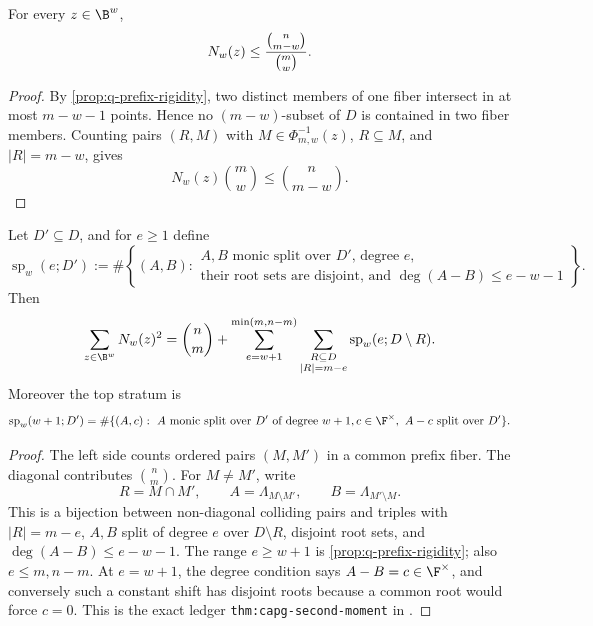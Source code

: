 \begin{corollary}\label{cor:q-anticode-cap}
For every \(z\in\B^w\),
\[
        N_w(z)\le {\binom{n}{m-w}\over \binom{m}{w}}.
\]
\end{corollary}

\begin{proof}
By \cref{prop:q-prefix-rigidity}, two distinct members of one fiber intersect
in at most \(m-w-1\) points.  Hence no \((m-w)\)-subset of \(D\) is contained
in two fiber members.  Counting pairs \((R,M)\) with
\(M\in\Phi_{m,w}^{-1}(z)\), \(R\subseteq M\), and \(|R|=m-w\), gives
\[
        N_w(z)\binom{m}{w}\le \binom{n}{m-w}.
\]
\end{proof}

\begin{proposition}\label{prop:q-second-moment}
Let \(D'\subseteq D\), and for \(e\ge1\) define
\[
\operatorname{sp}_w(e;D') :=
\#\left\{(A,B):
\begin{array}{l}
\text{\(A,B\) monic split over \(D'\), degree \(e\),}\\
\text{their root sets are disjoint, and } \deg(A-B)\le e-w-1
\end{array}\right\}.
\]
Then
\[
        \sum_{z\in\B^w}N_w(z)^2
        =
        \binom{n}{m}
        +\sum_{e=w+1}^{\min(m,n-m)}
          \sum_{\substack{R\subseteq D\\ |R|=m-e}}
          \operatorname{sp}_w(e;D\setminus R).
\]
Moreover the top stratum is
\[
\operatorname{sp}_w(w+1;D')=
\#\{(A,c):\ A\text{ monic split over }D'\text{ of degree }w+1,
c\in\F^\times,\ A-c\text{ split over }D'\}.
\]
\end{proposition}

\begin{proof}
The left side counts ordered pairs \((M,M')\) in a common prefix fiber.  The
diagonal contributes \(\binom{n}{m}\).  For \(M\ne M'\), write
\[
        R=M\cap M',\qquad
        A=\Lambda_{M\setminus M'},\qquad
        B=\Lambda_{M'\setminus M}.
\]
This is a bijection between non-diagonal colliding pairs and triples with
\(|R|=m-e\), \(A,B\) split of degree \(e\) over \(D\setminus R\), disjoint root
sets, and \(\deg(A-B)\le e-w-1\).  The range \(e\ge w+1\) is
\cref{prop:q-prefix-rigidity}; also \(e\le m,n-m\).  At \(e=w+1\), the degree
condition says \(A-B=c\in\F^\times\), and conversely such a constant shift has
disjoint roots because a common root would force \(c=0\).  This is the exact
ledger \texttt{thm:capg-second-moment} in \cite{CAP25v13}.
\end{proof}

